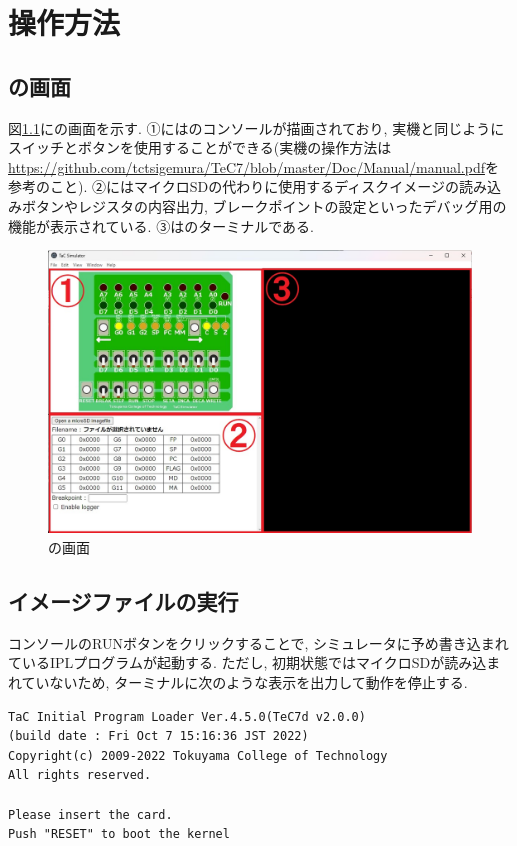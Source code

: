 \chapter{操作方法}

\section{\tacsim の画面}

図\ref{fig:ch3-tacsim}に\tacsim の画面を示す. ①には\tac のコンソールが描画されており, 実機と同じようにスイッチとボタンを使用することができる(実機の操作方法は\url{https://github.com/tctsigemura/TeC7/blob/master/Doc/Manual/manual.pdf}を参考のこと). ②にはマイクロSDの代わりに使用するディスクイメージの読み込みボタンやレジスタの内容出力, ブレークポイントの設定といったデバッグ用の機能が表示されている. ③は\tacsim のターミナルである.

\begin{figure}[H]
    \centering
    \includegraphics[width=12cm]{"figs/chapter3-tacsimulator.jpg"}
    \caption{\tacsim の画面} \label{fig:ch3-tacsim}
\end{figure}

\section{イメージファイルの実行}

コンソールのRUNボタンをクリックすることで, シミュレータに予め書き込まれているIPLプログラムが起動する. ただし, 初期状態ではマイクロSDが読み込まれていないため, ターミナルに次のような表示を出力して動作を停止する.

\begin{mylist}
\begin{verbatim}
TaC Initial Program Loader Ver.4.5.0(TeC7d v2.0.0)
(build date : Fri Oct 7 15:16:36 JST 2022)
Copyright(c) 2009-2022 Tokuyama College of Technology
All rights reserved.

Please insert the card.
Push "RESET" to boot the kernel
\end{verbatim}
\end{mylist}

